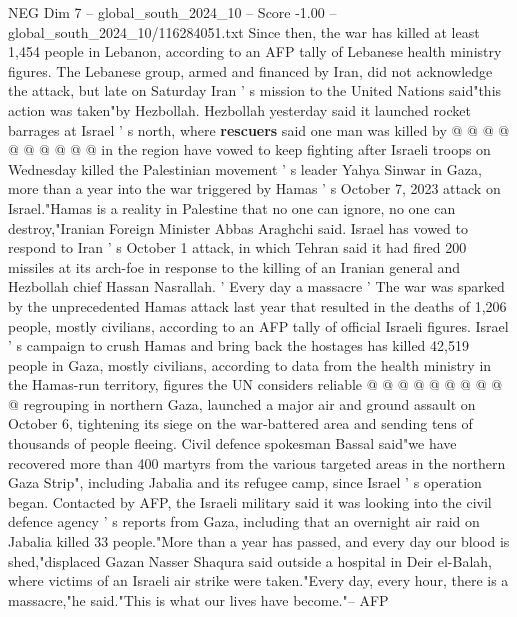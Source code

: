 \begin{textsample}{NEG Dim 7 – global\_south\_2024\_10 – Score -1.00 – global\_south\_2024\_10/116284051.txt}
Since then, the war has killed at least 1,454 people in Lebanon, according to an AFP tally of Lebanese health ministry figures.
The Lebanese group, armed and financed by Iran, did not acknowledge the attack, but late on Saturday Iran ' s mission to the United Nations said"this action was taken"by Hezbollah.
Hezbollah yesterday said it launched rocket barrages at Israel ' s north, where \textbf{rescuers} said one man was killed by @ @ @ @ @ @ @ @ @ @ in the region have vowed to keep fighting after Israeli troops on Wednesday killed the Palestinian movement ' s leader Yahya Sinwar in Gaza, more than a year into the war triggered by Hamas ' s October 7, 2023 attack on Israel."Hamas is a reality in Palestine that no one can ignore, no one can destroy,"Iranian Foreign Minister Abbas Araghchi said.
Israel has vowed to respond to Iran ' s October 1 attack, in which Tehran said it had fired 200 missiles at its arch-foe in response to the killing of an Iranian general and Hezbollah chief Hassan Nasrallah. ' Every day a massacre ' The war was sparked by the unprecedented Hamas attack last year that resulted in the deaths of 1,206 people, mostly civilians, according to an AFP tally of official Israeli figures.
Israel ' s campaign to crush Hamas and bring back the hostages has killed 42,519 people in Gaza, mostly civilians, according to data from the health ministry in the Hamas-run territory, figures the UN considers reliable @ @ @ @ @ @ @ @ @ @ regrouping in northern Gaza, launched a major air and ground assault on October 6, tightening its siege on the war-battered area and sending tens of thousands of people fleeing.
Civil defence spokesman Bassal said"we have recovered more than 400 martyrs from the various targeted areas in the northern Gaza Strip", including Jabalia and its refugee camp, since Israel ' s operation began.
Contacted by AFP, the Israeli military said it was looking into the civil defence agency ' s reports from Gaza, including that an overnight air raid on Jabalia killed 33 people."More than a year has passed, and every day our blood is shed,"displaced Gazan Nasser Shaqura said outside a hospital in Deir el-Balah, where victims of an Israeli air strike were taken."Every day, every hour, there is a massacre,"he said."This is what our lives have become."-- AFP

\end{textsample}
